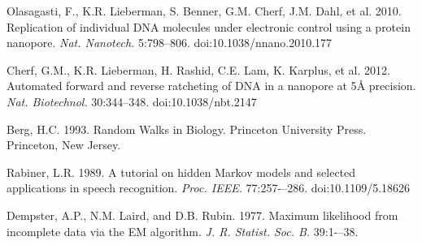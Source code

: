 \documentclass{biophys_letter}
\begin{document}
\begin{multicols}{2}
\begin{thebibliography}{99}
  Olasagasti, F., K.R. Lieberman, S. Benner, G.M. Cherf, J.M. Dahl, et al.
  2010.
  Replication of individual DNA molecules under electronic control using a protein nanopore.
  {\it Nat. Nanotech.}
  5:798–806.
  doi:10.1038/nnano.2010.177

  Cherf, G.M., K.R. Lieberman, H. Rashid, C.E. Lam, K. Karplus, et al.
  2012.
  Automated forward and reverse ratcheting of DNA in a nanopore at 5{\AA} precision.
  {\it Nat. Biotechnol.}
  30:344--348.
  doi:10.1038/nbt.2147

  Berg, H.C.
  1993.
  Random Walks in Biology.
  Princeton University Press.
  Princeton, New Jersey.

  Rabiner, L.R.
  1989.
  A tutorial on hidden Markov models and selected applications in speech recognition.
  {\it Proc. IEEE.}
  77:257-–286.
  doi:10.1109/5.18626

  Dempster, A.P., N.M. Laird, and D.B. Rubin.
  1977.
  Maximum likelihood from incomplete data via the EM algorithm.
  {\it J. R. Statist. Soc. B.}
  39:1-–38.

\end{thebibliography}

\end{multicols}
\end{document}
